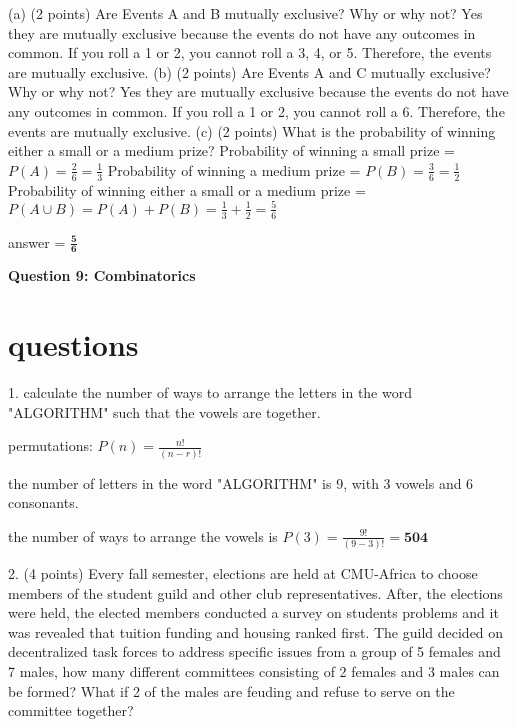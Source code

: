 \documentclass{article}
\begin{document}
(a) (2 points) Are Events A and B mutually exclusive? Why or why not?\newline
Yes they are mutually exclusive because the events do not have any outcomes in common. If you roll a 1 or 2, you cannot roll a 3, 4, or 5. Therefore, the events are mutually exclusive.\newline\newline
(b) (2 points) Are Events A and C mutually exclusive? Why or why not?\newline
Yes they are mutually exclusive because the events do not have any outcomes in common. If you roll a 1 or 2, you cannot roll a 6. Therefore, the events are mutually exclusive.\newline\newline
(c) (2 points) What is the probability of winning either a small or a medium prize?\newline
Probability of winning a small prize = \(P(A) = \frac{2}{6} = \frac{1}{3}\)\newline
Probability of winning a medium prize = \(P(B) = \frac{3}{6} = \frac{1}{2}\)\newline
Probability of winning either a small or a medium prize = \(P(A \cup B) = P(A) + P(B) = \frac{1}{3} + \frac{1}{2} = \frac{5}{6}\)\newline

answer = \(\mathbf{\frac{5}{6}}\)\newline

\begin{center}
    \large \textbf{Question 9: Combinatorics}
\end{center}

\section{questions}

1. calculate the number of ways to arrange the letters in the word "ALGORITHM" such that the vowels are together.

permutations: \(P(n) = \frac{n!}{(n-r)!}\)

the number of letters in the word "ALGORITHM" is 9, with 3 vowels and 6 consonants.

the number of ways to arrange the vowels is \(P(3) = \frac{9!}{(9-3)!} = \textbf{504}\) \newline

2. (4 points) Every fall semester, elections are held at CMU-Africa to choose members of the student
guild and other club representatives. After, the elections were held, the elected members conducted
a survey on students problems and it was revealed that tuition funding and housing ranked first.
The guild decided on decentralized task forces to address specific issues from a group of 5 females
and 7 males, how many different committees consisting of 2 females and 3 males can be formed?
What if 2 of the males are feuding and refuse to serve on the committee together?\newline
\end{document}

